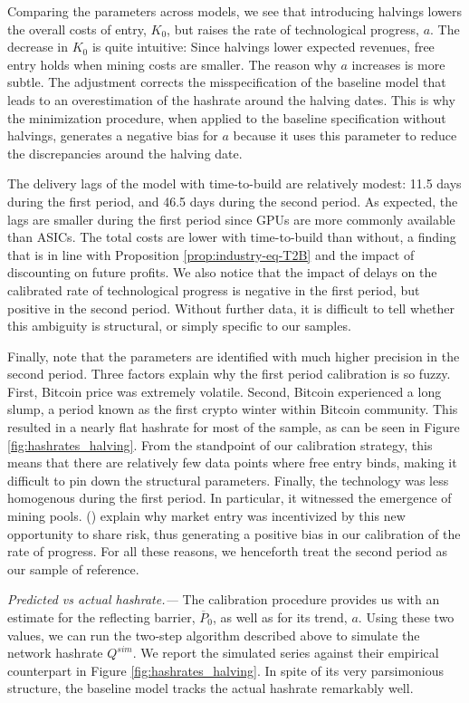 \documentclass[12pt, a4paper]{article}
\begin{document}
Comparing the parameters across models, we see that introducing halvings
lowers the overall costs of entry, $K_{0}$,
but raises the rate of technological progress, $a$. The decrease
in $K_{0}$ is quite intuitive: Since halvings lower expected revenues,
free entry holds when mining costs are smaller. The reason why $a$
increases is more subtle. The adjustment corrects the
misspecification of the baseline model that leads to an overestimation of the
hashrate around the halving dates. This is why the minimization procedure,
when applied to the baseline specification without halvings, generates a
negative bias for $a$ because it uses this parameter to reduce the discrepancies
around the halving date.

The delivery lags of the model with time-to-build are
relatively modest: 11.5 days during the first period, and 46.5 days
during the second period.
As expected, the lags are smaller during the first period since GPUs are more commonly available than ASICs. The total costs are lower
with time-to-build than without, a finding that is in line with Proposition \ref{prop:industry-eq-T2B} and the impact of discounting on future profits.
We also notice that the impact of delays on the calibrated rate of technological progress is negative in the first period, but positive in the second period.
Without further data, it is difficult to tell whether this ambiguity is structural, or simply specific to our samples.

Finally, note that the parameters are identified with much higher precision in the second period. Three factors explain why the first period calibration
is so fuzzy. First, Bitcoin price was extremely volatile. Second, Bitcoin experienced a long slump, a period known as the first crypto winter within
Bitcoin community. This resulted in a nearly flat hashrate for most of the sample, as can be seen in Figure \ref{fig:hashrates_halving}.
From the standpoint of our calibration strategy, this means that there are relatively few data points where free entry binds, making it
difficult to pin down the structural parameters. Finally, the technology was less homogenous during the first period.
In particular, it witnessed the emergence of mining pools. \citeauthor{Cong2018} (\citeyear{Cong2018})
explain why market entry was incentivized by this new opportunity to share risk, thus generating a positive bias in our calibration
of the rate of progress.
For all these reasons, we henceforth treat the second period as our sample of reference.

\emph{Predicted vs actual hashrate.---} The calibration procedure provides us
with an estimate for the reflecting barrier, $\overline{P}_0$, as well as
for its trend, $a$. Using these two values, we can run the two-step
algorithm described above to simulate the network hashrate $%
Q^{sim}$. We report the simulated series against their empirical
counterpart in Figure \ref{fig:hashrates_halving}. In spite of its very parsimonious
structure, the baseline model tracks the actual hashrate remarkably well.
\end{document}
